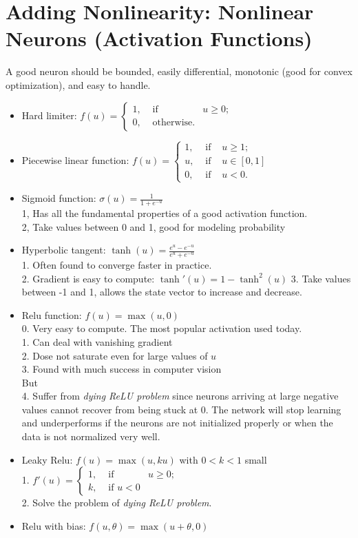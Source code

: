 \documentclass[twoside,12pt]{article}
\begin{document}
\section{Adding Nonlinearity: Nonlinear Neurons (Activation Functions)}
A good neuron should be bounded, easily differential, monotonic (good for convex optimization), and easy to handle.
\begin{itemize}
\item Hard limiter: $f(u) = \left\{ \begin{array}{lcr} 1, & \mbox{ if } & u \geq 0; \\ 0, & \mbox{ otherwise}.& \end{array} \right.$
\item Piecewise linear function: $f(u) = \left\{ \begin{array}{lcr} 1, & \mbox{ if } & u \geq 1; \\ u, &\mbox{ if }& u \in [0,1] \\ 0, & \mbox{ if } & u < 0. \end{array} \right.$
\item Sigmoid function: $\sigma(u) = \frac{1}{1+e^{-u}}$ \\
1, Has all the fundamental properties of a good activation function.\\
2, Take values between 0 and 1, good for modeling probability 
\item Hyperbolic tangent: $\tanh(u) = \frac{e^u - e^{-u}}{e^u + e^{-u}}$\\
1. Often found to converge faster in practice. \\
2. Gradient is easy to compute: $\tanh'(u) = 1- \tanh^2(u)$
3. Take values between -1 and 1, allows the state vector to increase and decrease.
\item Relu function: $f(u) = \max (u,0)$ \\
0. Very easy to compute. The most popular activation used today.\\
1. Can deal with vanishing gradient\\
2. Dose not saturate even for large values of $u$\\
3. Found with much success in computer vision \\
But \\
4. Suffer from \textit{dying ReLU problem} since neurons arriving at large negative values cannot recover from being stuck at 0. The network will stop learning and underperforms if the neurons are not initialized properly or when the data is not normalized very well.
\item Leaky Relu: $f(u) = \max (u,ku)$ with  $0 < k < 1$ small\\
1. $f'(u) = \left\{ \begin{array}{lcr} 1, & \mbox{ if } & u \geq 0; \\ k, & \mbox{ if } u < 0& \end{array} \right.$ \\
2. Solve the problem of \textit{dying ReLU problem}.
\item Relu with bias: $f(u, \theta) = \max(u+\theta, 0)$
\end{itemize}
\end{document}
